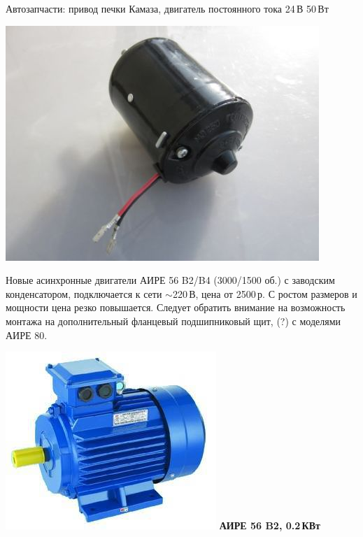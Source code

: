 \documentclass{magazine}
\begin{document}
{\bigskip
Автозапчасти: привод печки Камаза, двигатель постоянного тока 24\,В
  50\,Вт
  
\noindent\includegraphics[width=\columnwidth]{fig/00/KamazDvig.jpg}
  
\bigskip
Новые асинхронные двигатели АИРЕ 56 B2/B4 (3000/1500 об.)
с заводским конденсатором, подключается к сети $\sim$220\,В, цена от 2500\,р.
С ростом размеров и мощности цена резко повышается.
Следует обратить внимание на возможность монтажа на дополнительный фланцевый
подшипниковый щит, (?) с моделями АИРЕ 80.

\noindent\includegraphics[width=\columnwidth]{fig/00/AIRE.jpg}
\textbf{АИРЕ 56 B2, 0.2\,КВт}

}
\end{document}
